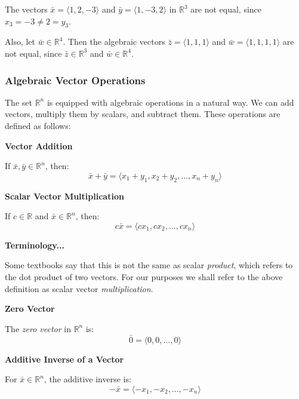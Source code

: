 \begin{examplebox}
The vectors $\bar{x} = \langle 1, 2, -3 \rangle$ and $\bar{y} = \langle 1, -3, 2 \rangle$ in $\mathbb{R}^3$ are not equal, since $x_3 = -3 \neq 2 = y_3$.

Also, let $\bar{w} \in \mathbb{R}^4$. Then the algebraic vectors $\bar{z} = \langle 1, 1, 1 \rangle$ and $\bar{w} = \langle 1, 1, 1, 1 \rangle$ are not equal, since $\bar{z} \in \mathbb{R}^3$ and $\bar{w} \in \mathbb{R}^4$.

\end{examplebox}

\newpage

\subsubsection{Algebraic Vector Operations}


The set $\mathbb{R}^n$ is equipped with algebraic operations in a natural way.
We can add vectors, multiply them by scalars, and subtract them.
These operations are defined as follows:
\begin{definitionbox}
\textbf{Vector Addition}

If $\bar{x}, \bar{y} \in \mathbb{R}^n$, then:
\[
\bar{x} + \bar{y} = \langle x_1 + y_1, x_2 + y_2, ..., x_n + y_n \rangle
\]
\end{definitionbox}

\begin{definitionbox}
\textbf{Scalar Vector Multiplication}

If $c \in \mathbb{R}$ and $\bar{x} \in \mathbb{R}^n$, then:
\[
c\bar{x} = \langle cx_1, cx_2, ..., cx_n \rangle
\]
\end{definitionbox}

\begin{notebox}
\textbf{Terminology...}

Some textbooks say that this is not the same as scalar \textit{product}, which refers 
to the dot product of two vectors. 
For our purposes we shall refer to the above definition as scalar vector \textit{multiplication}.
\end{notebox}

\begin{definitionbox}
\textbf{Zero Vector}

The \textit{zero vector} in $\mathbb{R}^n$ is:
\[
\bar{0} = \langle 0, 0, ..., 0 \rangle
\]
\end{definitionbox}

\begin{definitionbox}
\textbf{Additive Inverse of a Vector}

For $\bar{x} \in \mathbb{R}^n$, the additive inverse is:
\[
-\bar{x} = \langle -x_1, -x_2, ..., -x_n \rangle
\]
\end{definitionbox}

